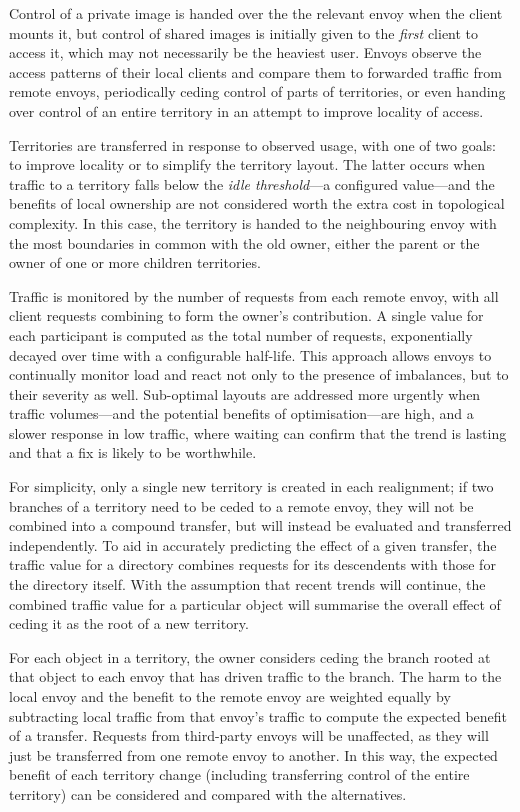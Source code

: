 Control of a private image is handed over the the relevant envoy when the client mounts it, but control of shared images is initially given to the \emph{first} client to access it, which may not necessarily be the heaviest user. Envoys observe the access patterns of their local clients and compare them to forwarded traffic from remote envoys, periodically ceding control of parts of territories, or even handing over control of an entire territory in an attempt to improve locality of access.

Territories are transferred in response to observed usage, with one of two goals: to improve locality or to simplify the territory layout. The latter occurs when traffic to a territory falls below the \emph{idle threshold}---a configured value---and the benefits of local ownership are not considered worth the extra cost in topological complexity. In this case, the territory is handed to the neighbouring envoy with the most boundaries in common with the old owner, either the parent or the owner of one or more children territories.

Traffic is monitored by the number of requests from each remote envoy, with all client requests combining to form the owner's contribution. A single value for each participant is computed as the total number of requests, exponentially decayed over time with a configurable half-life. This approach allows envoys to continually monitor load and react not only to the presence of imbalances, but to their severity as well. Sub-optimal layouts are addressed more urgently when traffic volumes---and the potential benefits of optimisation---are high, and a slower response in low traffic, where waiting can confirm that the trend is lasting and that a fix is likely to be worthwhile.

For simplicity, only a single new territory is created in each realignment; if two branches of a territory need to be ceded to a remote envoy, they will not be combined into a compound transfer, but will instead be evaluated and transferred independently. To aid in accurately predicting the effect of a given transfer, the traffic value for a directory combines requests for its descendents with those for the directory itself. With the assumption that recent trends will continue, the combined traffic value for a particular object will summarise the overall effect of ceding it as the root of a new territory.

For each object in a territory, the owner considers ceding the branch rooted at that object to each envoy that has driven traffic to the branch. The harm to the local envoy and the benefit to the remote envoy are weighted equally by subtracting local traffic from that envoy's traffic to compute the expected benefit of a transfer. Requests from third-party envoys will be unaffected, as they will just be transferred from one remote envoy to another. In this way, the expected benefit of each territory change (including transferring control of the entire territory) can be considered and compared with the alternatives.

